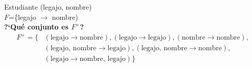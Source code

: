 \documentclass[preview]{standalone}
\begin{document}
Estudiante (legajo, nombre)\\
$F$=\{legajo $\rightarrow$ nombre)\\

\textbf{?`Qu\'e conjunto es $F^+$?}\\
\begin{align*}
F^+ = \big\{ & (\text{legajo} \rightarrow \text{nombre}), (\text{legajo} \rightarrow \text{legajo}), (\text{nombre} \rightarrow \text{nombre}),\\
 & (\text{legajo, nombre} \rightarrow \text{legajo}), (\text{legajo, nombre} \rightarrow \text{nombre}),\\  
 & (\text{legajo} \rightarrow \text{nombre, legajo})\big\}   
\end{align*}
\end{document}
